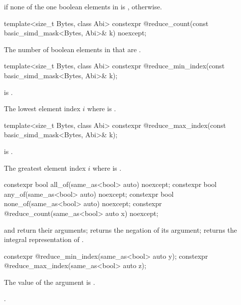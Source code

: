 \begin{itemdescr}
  \pnum\returns
   if none of the one boolean elements in  is ,  otherwise.
\end{itemdescr}

\begin{itemdecl}
template<size_t Bytes, class Abi>
  constexpr @\simdsizetype@ reduce_count(const basic_simd_mask<Bytes, Abi>& k) noexcept;
\end{itemdecl}

\begin{itemdescr}
  \pnum\returns
  The number of boolean elements in  that are .
\end{itemdescr}

\begin{itemdecl}
template<size_t Bytes, class Abi>
  constexpr @\simdsizetype@ reduce_min_index(const basic_simd_mask<Bytes, Abi>& k);
\end{itemdecl}

\begin{itemdescr}
  \pnum\expects
   is .

  \pnum\returns
  The lowest element index $i$ where  is .
\end{itemdescr}

\begin{itemdecl}
template<size_t Bytes, class Abi>
  constexpr @\simdsizetype@ reduce_max_index(const basic_simd_mask<Bytes, Abi>& k);
\end{itemdecl}

\begin{itemdescr}
  \pnum\expects
   is .

  \pnum\returns
  The greatest element index $i$ where  is .
\end{itemdescr}

\begin{itemdecl}
constexpr bool all_of(same_as<bool> auto) noexcept;
constexpr bool any_of(same_as<bool> auto) noexcept;
constexpr bool none_of(same_as<bool> auto) noexcept;
constexpr @\simdsizetype@ reduce_count(same_as<bool> auto x) noexcept;
\end{itemdecl}

\begin{itemdescr}
  \pnum\returns
   and  return their arguments; 
  returns the negation of its argument;  returns the
  integral representation of .
\end{itemdescr}

\begin{itemdecl}
constexpr @\simdsizetype@ reduce_min_index(same_as<bool> auto y);
constexpr @\simdsizetype@ reduce_max_index(same_as<bool> auto z);
\end{itemdecl}

\begin{itemdescr}
  \pnum\expects
  The value of the argument is .

  \pnum\returns {}.
\end{itemdescr}


